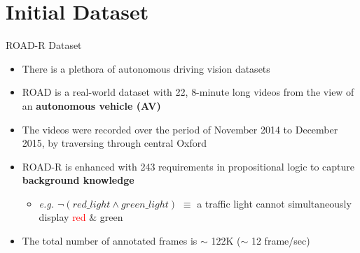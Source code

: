 \documentclass[10pt, aspectratio=169]{beamer}
\begin{document}
\section{Initial Dataset}
{
    \begin{frame}
        \sectionpage%
    \end{frame}
}

\begin{frame}{ROAD-R Dataset}
    \begin{itemize}
        \setlength{\itemsep}{12pt}
        \item There is a plethora of autonomous driving vision datasets
        \item ROAD is a real-world dataset with \textcolor{umBlueLighter}{22}, \textcolor{umBlueLighter}{8-minute} long videos from the view of an \textbf{autonomous vehicle (AV)}
        \item The videos were recorded over the period of November 2014 to December 2015, by traversing through central Oxford 
        \item  ROAD-R is enhanced with \textcolor{umBlueLighter}{243} requirements in propositional logic to capture \textbf{background knowledge} 
        \vspace{4pt}
        \begin{itemize}
            \item \textit{e.g. $\neg (red\_light \wedge green\_light)$ }$\equiv$ a traffic light cannot simultaneously display \textcolor{red}{red} \&  \textcolor{green!60!black}{green} 
        \end{itemize}
        \item The total number of annotated frames is $\sim$ 122K ($\sim$ 12 frame/sec)
    \end{itemize}
\end{frame}
\end{document}
